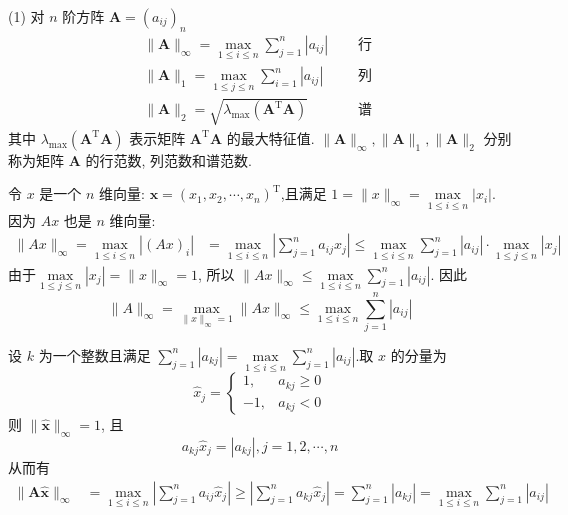 \begin{tcolorbox}[enhanced,colback=2,colframe=1,breakable,coltitle=black,title=定理]
 (1) 对 $ n $ 阶方阵 $ \boldsymbol{A}=\left(a_{i j}\right)_{n} $
$$
\begin{array}{ll}
\|\boldsymbol{A}\|_{\infty}=\max\limits _{1 \leqslant i \leqslant n} \sum_{j=1}^{n}\left|a_{i j}\right| &\quad \text { 行 } \\
\|\boldsymbol{A}\|_{1}=\max \limits_{1 \leqslant j \leqslant n} \sum_{i=1}^{n}\left|a_{i j}\right| &\quad \text { 列 } \\
\|\boldsymbol{A}\|_{2}=\sqrt{\lambda_{\max }\left(\boldsymbol{A}^{\mathrm{T}} \boldsymbol{A}\right)} &\quad \text { 谱 }
\end{array}
$$
其中 $ \lambda_{\max }\left(\boldsymbol{A}^{\mathrm{T}} \boldsymbol{A}\right) $ 表示矩阵 $ \boldsymbol{A}^{\mathrm{T}} \boldsymbol{A} $ 的最大特征值. $ \|\boldsymbol{A}\|_{\infty},\|\boldsymbol{A}\|_{1},\|\boldsymbol{A}\|_{2} $ 分别称为矩阵 $ \boldsymbol{A} $ 的行范数, 列范数和谱范数.
\end{tcolorbox}
令 $ x $ 是一个 $n$ 维向量: $ \boldsymbol{x}=\left(x_{1}, x_{2}, \cdots, x_{n}\right)^{\mathrm{T}} $,且满足 $ 1=\|x\|_{\infty}=\max\limits _{1 \leqslant i \leqslant n}\left|x_{i}\right| $. 因为 $ A x $ 也是 $n$ 维向量:
$$
\begin{aligned}
\|A x\|_{\infty}=\max _{1 \leqslant i \leqslant n}\left|(A x)_{i}\right| & =\max _{1 \leqslant i \leqslant n}\left|\sum_{j=1}^{n} a_{i j} x_{j}\right|  \leqslant \max _{1 \leqslant i \leqslant n} \sum_{j=1}^{n}\left|a_{i j}\right| \cdot \max _{1 \leqslant j \leqslant n}\left|x_{j}\right|
\end{aligned}
$$
由于$ \max\limits _{1 \leqslant j \leqslant n}\left|x_{j}\right|=\|x\|_{\infty}=1 $,
所以 $ \|A x\|_{\infty} \leqslant \max\limits _{1 \leqslant i \leqslant n} \sum\limits_{j=1}^{n}\left|a_{i j}\right| $.
因此 $$ \|A\|_{\infty}=\max _{\|x\|_{\infty}=1}\|A x\|_{\infty} \leqslant \max _{1 \leqslant i \leqslant n} \sum_{j=1}^{n}\left|a_{i j}\right| $$

设 $ k $ 为一个整数且满足 $ \sum\limits_{j=1}^{n}\left|a_{k j}\right|=\max\limits _{1 \leqslant i \leqslant n} \sum\limits_{j=1}^{n}\left|a_{i j}\right| $.取 $ x $ 的分量为
$$
\hat{x}_{j}=\left\{\begin{array}{ll}
1, & a_{k j} \geqslant 0 \\
-1, & a_{k j}<0
\end{array}\right.
$$
则 $ \|\hat{\boldsymbol{x}}\|_{\infty}=1 $, 且
$$
a_{k j} \hat{x}_{j}=\left|a_{k j}\right|, j=1,2, \cdots, n
$$
从而有
$$
\begin{aligned}
\|\boldsymbol{A} \hat{\boldsymbol{x}}\|_{\infty} &= \max _{1 \leqslant i \leqslant n}\left|\sum_{j=1}^{n} a_{i j} \hat{x}_{j}\right| \geqslant\left|\sum_{j=1}^{n} a_{k j} \hat{x}_{j}\right| 
 =\sum_{j=1}^{n}\left|a_{k j}\right|=\max _{1 \leqslant i \leqslant n} \sum_{j=1}^{n}\left|a_{i j}\right|
\end{aligned}
$$

